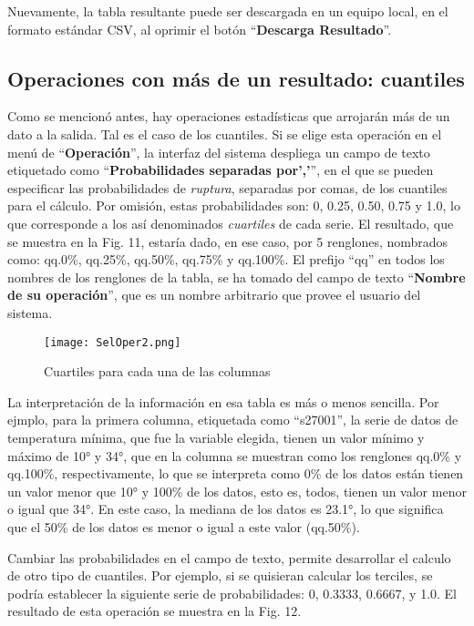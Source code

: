 \documentclass[spanish,]{article}
\begin{document}
Nuevamente, la tabla resultante puede ser descargada en un equipo local,
en el formato estándar CSV, al oprimir el botón ``\textbf{Descarga
Resultado}''.

\subsection{Operaciones con más de un resultado:
cuantiles}\label{operaciones-con-mas-de-un-resultado-cuantiles}

Como se mencionó antes, hay operaciones estadísticas que arrojarán más
de un dato a la salida. Tal es el caso de los cuantiles. Si se elige
esta operación en el menú de ``\textbf{Operación}'', la interfaz del
sistema despliega un campo de texto etiquetado como
``\textbf{Probabilidades separadas por','}'', en el que se pueden
especificar las probabilidades de \emph{ruptura}, separadas por comas,
de los cuantiles para el cálculo. Por omisión, estas probabilidades son:
0, 0.25, 0.50, 0.75 y 1.0, lo que corresponde a los así denominados
\emph{cuartiles} de cada serie. El resultado, que se muestra en la Fig.
11, estaría dado, en ese caso, por 5 renglones, nombrados como: qq.0\%,
qq.25\%, qq.50\%, qq.75\% y qq.100\%. El prefijo ``qq'' en todos los
nombres de los renglones de la tabla, se ha tomado del campo de texto
``\textbf{Nombre de su operación}'', que es un nombre arbitrario que
provee el usuario del sistema.

\begin{figure}
\centering
\texttt{[image: SelOper2.png]}
\caption{Cuartiles para cada una de las columnas}
\end{figure}

La interpretación de la información en esa tabla es más o menos
sencilla. Por ejmplo, para la primera columna, etiquetada como
``s27001'', la serie de datos de temperatura mínima, que fue la variable
elegida, tienen un valor mínimo y máximo de 10° y 34°, que en la columna
se muestran como los renglones qq.0\% y qq.100\%, respectivamente, lo
que se interpreta como 0\% de los datos están tienen un valor menor que
10° y 100\% de los datos, esto es, todos, tienen un valor menor o igual
que 34°. En este caso, la mediana de los datos es 23.1°, lo que
significa que el 50\% de los datos es menor o igual a este valor
(qq.50\%).

Cambiar las probabilidades en el campo de texto, permite desarrollar el
calculo de otro tipo de cuantiles. Por ejemplo, si se quisieran calcular
los terciles, se podría establecer la siguiente serie de probabilidades:
0, 0.3333, 0.6667, y 1.0. El resultado de esta operación se muestra en
la Fig. 12.
\end{document}
